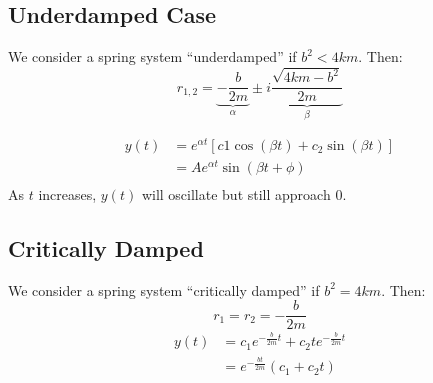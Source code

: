 \documentclass[12pt]{report}
\begin{document}
\subsection{Underdamped Case}
We consider a spring system ``underdamped'' if $b^2 < 4km$. Then:
\[ r_{1,2} = \underbrace{- \frac{b}{2m}}_{\alpha} \pm i \underbrace{\frac{\sqrt{4km-b^2}}{2m}}_{\beta} \]

\begin{align*}
	y(t) &= e^{\alpha t} \left[ c1 \cos(\beta t) + c_2 \sin(\beta 
	t) \right] \\
	&= Ae^{\alpha t} \sin(\beta t + \phi) \\
\end{align*}
As $t$ increases, $y(t)$ will oscillate but still approach $0$.

\subsection{Critically Damped}
We consider a spring system ``critically damped'' if $b^2 = 4km$. Then:
\[ r_1 = r_2 = - \frac{b}{2m} \]
\begin{align*}
	y(t) &= c_1 e^{- \frac{b}{2m} t} + c_2 te^{- \frac{b}{2m} t} \\
	&= e^{- \frac{bt}{2m}} \left( c_1 + c_2 t \right)
\end{align*}
\end{document}
